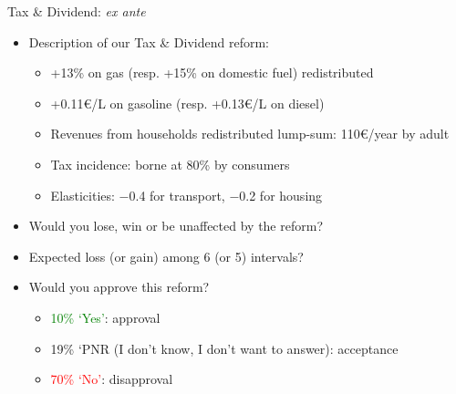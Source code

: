 \documentclass[aspectratio=169,9pt,dvipsnames]{beamer}
\begin{document}
   
    \begin{frame}{Tax \& Dividend: \textit{ex ante}} \label{main_reform}
\begin{itemize}%
    \item Description of our Tax \& Dividend reform:
    \begin{itemize}
        \item +13\% on gas (resp. +15\% on domestic fuel) redistributed
        \item +0.11\euro{}/L on gasoline (resp. +0.13\euro{}/L on diesel) 
        \item Revenues from households redistributed lump-sum: 110\euro{}/year by adult
        \item Tax incidence: borne at 80\% by consumers
        \item Elasticities: $-$0.4 for transport, $-$0.2 for housing
    \end{itemize}

    \pause
    \item Would you lose, win or be unaffected by the reform?
    \item Expected loss (or gain) among 6 (or 5) intervals?
    \pause
    \item Would you approve this reform?
    \begin{itemize}
        \item \textcolor{Green}{10\% `Yes'}: approval
         \item 19\% `PNR (I don't know, I don't want to answer): acceptance
         \item \textcolor{red}{70\% `No'}: disapproval
    \end{itemize}    
\end{itemize}
    \end{frame}
\end{document}
